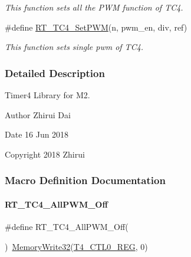 \begin{DoxyCompactItemize}
\begin{DoxyCompactList}\small\item\em This function sets all the P\+WM function of T\+C4. \end{DoxyCompactList}\item 
\#define \mbox{\hyperlink{a00050_ada2806f77e8e1cf7e64c5b9e13479119}{R\+T\+\_\+\+T\+C4\+\_\+\+Set\+P\+WM}}(n,  pwm\+\_\+en,  div,  ref)
\begin{DoxyCompactList}\small\item\em This function sets single pwm of T\+C4. \end{DoxyCompactList}\end{DoxyCompactItemize}


\subsubsection{Detailed Description}
Timer4 Library for M2. 

\begin{DoxyAuthor}{Author}
Zhirui Dai 
\end{DoxyAuthor}
\begin{DoxyDate}{Date}
16 Jun 2018 
\end{DoxyDate}
\begin{DoxyCopyright}{Copyright}
2018 Zhirui 
\end{DoxyCopyright}


\subsubsection{Macro Definition Documentation}
\mbox{\label{a00050_a810820140a90f26db974ea72d81fac27}} 
\paragraph{\texorpdfstring{R\+T\+\_\+\+T\+C4\+\_\+\+All\+P\+W\+M\+\_\+\+Off}{RT\_TC4\_AllPWM\_Off}}
{\footnotesize\ttfamily \#define R\+T\+\_\+\+T\+C4\+\_\+\+All\+P\+W\+M\+\_\+\+Off(\begin{DoxyParamCaption}{ }\end{DoxyParamCaption})~\mbox{\hyperlink{a00020_a6b9732365b12e48ddb89fe1028b975b0}{Memory\+Write32}}(\mbox{\hyperlink{a00020_adadaa0ab1ebbd7ba9b70dfd24c3ed44dafd9396894f78b2346881d9f21f33ddac}{T4\+\_\+\+C\+T\+L0\+\_\+\+R\+EG}}, 0)}



